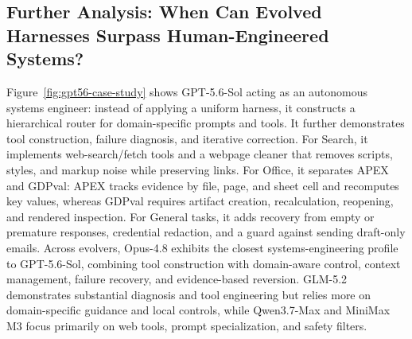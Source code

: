 \subsection{Further Analysis: When Can Evolved Harnesses Surpass Human-Engineered Systems?}
\label{sec:analysis}

Figure~\ref{fig:gpt56-case-study} shows GPT-5.6-Sol acting as an autonomous systems engineer: instead of applying a uniform harness, it constructs a hierarchical router for domain-specific prompts and tools. It further demonstrates tool construction, failure diagnosis, and iterative correction. For Search, it implements web-search/fetch tools and a webpage cleaner that removes scripts, styles, and markup noise while preserving links. For Office, it separates APEX and GDPval: APEX tracks evidence by file, page, and sheet cell and recomputes key values, whereas GDPval requires artifact creation, recalculation, reopening, and rendered inspection. For General tasks, it adds recovery from empty or premature responses, credential redaction, and a guard against sending draft-only emails. Across evolvers, Opus-4.8 exhibits the closest systems-engineering profile to GPT-5.6-Sol, combining tool construction with domain-aware control, context management, failure recovery, and evidence-based reversion. GLM-5.2 demonstrates substantial diagnosis and tool engineering but relies more on domain-specific guidance and local controls, while Qwen3.7-Max and MiniMax M3 focus primarily on web tools, prompt specialization, and safety filters.


